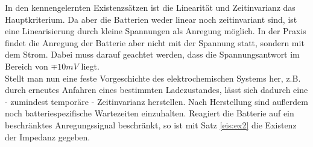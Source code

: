                                                                                                                                                                                                                                                                                                   
                                                                                                                                                                                                                                                                                                    
In den kennengelernten Existenzsätzen ist die Linearität und Zeitinvarianz das Hauptkriterium.                                                                                                                                                                                                                                                                                                                                                                                                                                                                                                                                                                                                               Da aber die Batterien weder linear noch zeitinvariant sind, ist eine Linearisierung durch kleine Spannungen als Anregung möglich. In der Praxis findet die Anregung der Batterie aber nicht mit der Spannung statt, sondern mit dem Strom. Dabei muss darauf geachtet werden, dass die Spannungsantwort im Bereich von $\mp 10 mV$ liegt\cite{Huet1998}.\\
                                                                                                                                                                                                                                                                                                     Stellt man nun eine feste Vorgeschichte des elektrochemischen Systems her, z.B. durch erneutes Anfahren eines bestimmten Ladezustandes, lässt sich dadurch eine - zumindest temporäre - Zeitinvarianz herstellen. Nach Herstellung sind außerdem noch batteriespezifische Wartezeiten einzuhalten. Reagiert die Batterie auf ein beschränktes Anregungssignal beschränkt, so ist mit Satz \ref{eis:ex2} die Existenz der Impedanz gegeben. \\\\
